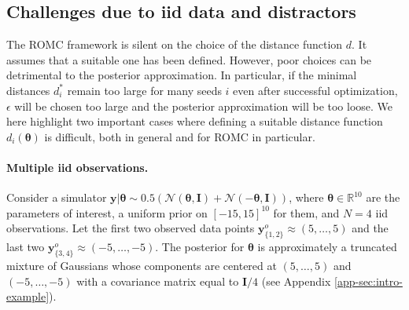 \documentclass[twoside]{article}
\newcommand{\thb}{\boldsymbol{\theta}}
\newcommand{\yb}{\mathbf{y}}
\newcommand{\data}{\mathbf{y}^o}
\begin{document}

\subsection{Challenges due to iid data and distractors}
\label{sec:romc-limitations}
The ROMC framework is silent on the choice of the distance function $d$. It assumes that a suitable one has been defined. However, poor choices can be detrimental to the posterior approximation. In particular, if the minimal distances $d_i^*$ remain too large for many seeds $i$ even after successful optimization, $\epsilon$ will be chosen too large and the posterior approximation will be too loose. We here highlight two important cases where defining a suitable distance function $d_i(\thb)$ is difficult, both in general and for ROMC in particular.

\paragraph{Multiple iid observations.}
Consider a simulator $\yb | \thb \sim 0.5\left ( \mathcal{N}(\thb, \mathbf{I}) + \mathcal{N}(-\thb, \mathbf{I}) \right )$, where $\thb \in \mathbb{R}^{10}$ are the parameters of interest, a uniform prior on $[-15, 15]^{10}$ for them, and $N=4$ iid observations. Let the first two observed data points $\data_{\{1,2\}} \approx (5, \ldots, 5)$ and the last two $\data_{\{3,4\}} \approx (-5, \ldots, -5)$.
The posterior for $\thb$ is approximately a truncated mixture of Gaussians whose components are centered at $(5, \ldots, 5)$ and $(-5, \ldots, -5)$ with a covariance matrix equal to $\mathbf{I}/4$ (see Appendix \ref{app-sec:intro-example}). 
\end{document}
